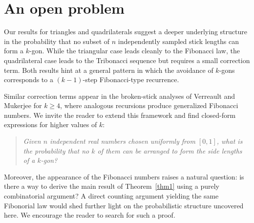 \documentclass{amsart}
\begin{document}
\section{An open problem}

Our results for triangles and quadrilaterals suggest a deeper underlying structure in the probability that no subset of $n$ independently sampled stick lengths can form a $k$-gon. While the triangular case leads cleanly to the Fibonacci law, the quadrilateral case leads to the Tribonacci sequence but requires a small correction term. Both results hint at a general pattern in which the avoidance of $k$-gons corresponds to a $(k-1)$-step Fibonacci-type recurrence.

Similar correction terms appear in the broken-stick analyses of Verreault and Mukerjee for $k \ge 4$, where analogous recursions produce generalized Fibonacci numbers. We invite the reader to extend this framework and find closed-form expressions for higher values of $k$:
\begin{quote}
  \emph{Given $n$ independent real numbers chosen uniformly from $[0,1]$, what is the probability that no $k$ of them can be arranged to form the side lengths of a $k$-gon?}
\end{quote}

Moreover, the appearance of the Fibonacci numbers raises a natural question: is there a way to derive the main result of Theorem~\ref{thm1} using a purely combinatorial argument? A direct counting argument yielding the same Fibonorial law would shed further light on the probabilistic structure uncovered here. We encourage the reader to search for such a proof.



\end{document}
